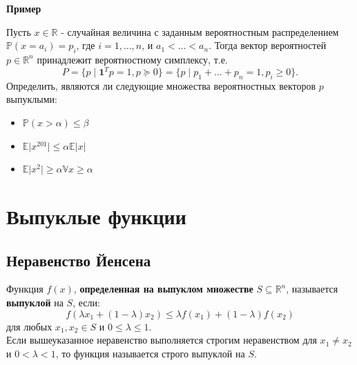 \documentclass[
  russian,
  letterpaper,
  DIV=11,
  numbers=noendperiod]{scrartcl}
\providecommand{\tightlist}{%
  \setlength{\itemsep}{0pt}\setlength{\parskip}{0pt}}
\begin{document}
\textbf{Пример}

Пусть \(x \in \mathbb{R}\) - случайная величина с заданным вероятностным
распределением \(\mathbb{P}(x = a_i) = p_i\), где \(i = 1, \ldots, n\),
и \(a_1 < \ldots < a_n\). Тогда вектор вероятностей
\(p \in \mathbb{R}^n\) принадлежит вероятностному симплексу, т.е. \[
P = \{ p \mid \mathbf{1}^Tp = 1, p \succeq 0 \} = \{ p \mid p_1 + \ldots + p_n = 1, p_i \ge 0 \}.
\] Определить, являются ли следующие множества вероятностных векторов
\(p\) выпуклыми:

\begin{itemize}
\tightlist
\item
  \(\mathbb{P}(x > \alpha) \le \beta\)
\item
  \(\mathbb{E} \vert x^{201}\vert \le \alpha \mathbb{E}\vert x \vert\)
\item
  \(\mathbb{E} \vert x^{2}\vert \ge \alpha\)\(\mathbb{V} x \ge \alpha\)
\end{itemize}

\section{Выпуклые
функции}\label{ux432ux44bux43fux443ux43aux43bux44bux435-ux444ux443ux43dux43aux446ux438ux438}

\subsection{Неравенство
Йенсена}\label{ux43dux435ux440ux430ux432ux435ux43dux441ux442ux432ux43e-ux439ux435ux43dux441ux435ux43dux430}

Функция \(f(x)\), \textbf{определенная на выпуклом множестве}
\(S \subseteq \mathbb{R}^n\), называется \textbf{выпуклой} на \(S\),
если: \[
f(\lambda x_1 + (1 - \lambda)x_2) \le \lambda f(x_1) + (1 - \lambda)f(x_2)
\] для любых \(x_1, x_2 \in S\) и \(0 \le \lambda \le 1\).\\
Если вышеуказанное неравенство выполняется строгим неравенством для
\(x_1 \neq x_2\) и \(0 < \lambda < 1\), то функция называется строго
выпуклой на \(S\).
\end{document}
